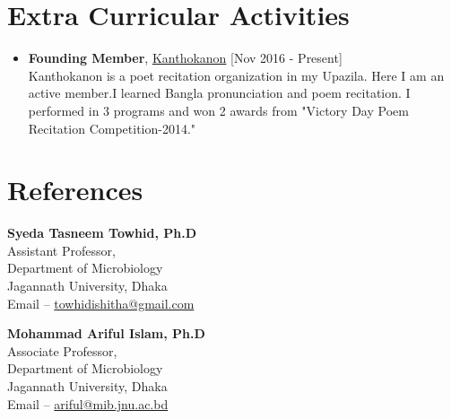\documentclass[11pt,a4paper]{moderncv}
\begin{document}
\section{Extra Curricular Activities}
\begin{itemize}
	\item \textbf{Founding Member}, 
	\textcolor{blue}{\href{}{Kanthokanon}}
	\hfill [Nov 2016 - Present]\\ 
	Kanthokanon is a poet recitation organization in my Upazila. Here I am an 
	active member.I learned Bangla pronunciation and poem recitation. I 
	performed in 3 programs and won 2 awards from "Victory Day Poem Recitation 
	Competition-2014."
\end{itemize}

	
\section{References}
\begin{multicols}{2}
\textbf{Syeda Tasneem Towhid, Ph.D}\\ 
Assistant Professor, \\ 
Department of Microbiology \\ 
Jagannath University, Dhaka \\ 
Email -- \textcolor{blue}{\url{towhidishitha@gmail.com}} 

\columnbreak 
\textbf{Mohammad Ariful Islam, Ph.D}\\ 
Associate Professor,\\ 
Department of Microbiology \\ 
Jagannath University, Dhaka \\ 
Email -- \textcolor{blue}{\url{ariful@mib.jnu.ac.bd}}
\end{multicols} 
\end{document}
